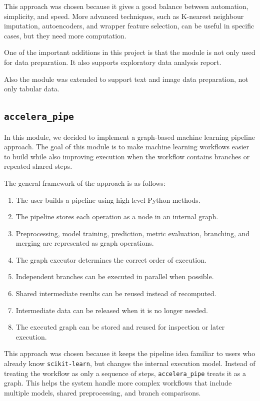 \documentclass[12pt,a4paper]{report}
\begin{document}
\noindent This approach was chosen because it gives a good balance between automation,
simplicity, and speed. More advanced techniques, such as
K-nearest neighbour imputation, autoencoders, and wrapper feature selection, can
be useful in specific cases, but they need more computation.

\noindent One of the important additions in this project is that the module is not
only used for data preparation. It also supports exploratory data analysis report.

\noindent Also the module was extended to support text and image data
preparation, not only tabular data.

\subsection{\texttt{accelera\_pipe}}
In this module, we decided to implement a graph-based machine learning pipeline
approach. The goal of this module is to make machine learning workflows easier
to build while also improving execution when the workflow contains branches or
repeated shared steps.

The general framework of the approach is as follows:
\begin{enumerate}
  \item The user builds a pipeline using high-level Python methods.
  \item The pipeline stores each operation as a node in an internal graph.
  \item Preprocessing, model training, prediction, metric evaluation, branching,
  and merging are represented as graph operations.
  \item The graph executor determines the correct order of execution.
  \item Independent branches can be executed in parallel when possible.
  \item Shared intermediate results can be reused instead of recomputed.
  \item Intermediate data can be released when it is no longer needed.
  \item The executed graph can be stored and reused for inspection or later execution.
\end{enumerate}

\noindent This approach was chosen because it keeps the pipeline idea familiar to
users who already know \texttt{scikit-learn}, but changes the internal execution
model. Instead of treating the workflow as only a sequence of steps,
\texttt{accelera\_pipe} treats it as a graph. This helps the system handle more
complex workflows that include multiple models, shared preprocessing, and branch
comparisons.
\end{document}
